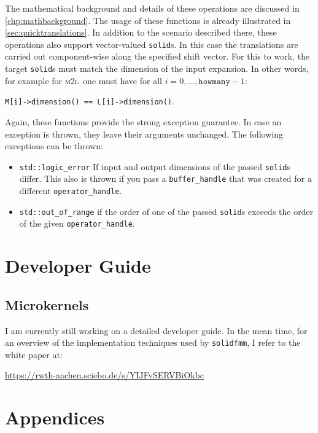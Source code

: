 \documentclass{scrbook}
\newcommand{\solidfmm}{\texttt{solidfmm}}
\newcommand{\MtoL}{\textsc{m2l}}
\begin{document}
The mathematical background and details of these operations are discussed in
\cref{chp:mathbackground}. The usage of these functions is already illustrated
in \cref{sec:quicktranslations}. In addition to the scenario described there,
these operations also support vector-valued \lstinline|solid|s. In this case
the translations are carried out component-wise along the specified shift
vector. For this to work, the target \lstinline|solid|s must match the
dimension of the input expansion. In other words, for example for 
\MtoL\ one must have for all $i=0,\dotsc,\mathtt{howmany}-1$:
\begin{center}
\lstinline|M[i]->dimension() == L[i]->dimension()|.
\end{center}

Again, these functions provide the strong exception guarantee. In case an
exception is thrown, they leave their arguments unchanged. The following
exceptions can be thrown:
\begin{itemize}
\item \lstinline|std::logic_error| If input and output dimensions of the passed
\lstinline|solid|s differ. This also is thrown if you pass a
\lstinline|buffer_handle| that was created for a different
\lstinline|operator_handle|.
\item \lstinline|std::out_of_range| if the order of one of the passed
\lstinline|solid|s exceeds the order of the given \lstinline|operator_handle|.
\end{itemize}

\part{Developer Guide}\label{part:developer}

\chapter{Microkernels}
I am currently still working on a detailed developer guide. In the mean time,
for an overview of the implementation techniques used by \solidfmm, I refer to
the white paper at:
\begin{center}
\url{https://rwth-aachen.sciebo.de/s/YIJFvSERVBiOkbc}
\end{center}

\appendix
\part*{Appendices}
\end{document}
